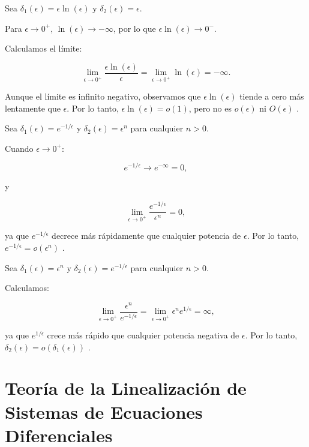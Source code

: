 \begin{example}
    Sea \(\delta_1(\epsilon) = \epsilon \ln(\epsilon)\) y \(\delta_2(\epsilon) = \epsilon\).

Para \(\epsilon \to 0^+\), \(\ln(\epsilon) \to -\infty\), por lo que \(\epsilon \ln(\epsilon) \to 0^-\).

Calculamos el límite:

\[
\lim_{\epsilon \to 0^+} \frac{\epsilon \ln(\epsilon)}{\epsilon} = \lim_{\epsilon \to 0^+} \ln(\epsilon) = -\infty.
\]

Aunque el límite es infinito negativo, observamos que \(\epsilon \ln(\epsilon)\) tiende a cero más lentamente que \(\epsilon\). Por lo tanto, \(\epsilon \ln(\epsilon) = o(1)\), pero no es \(o\left( \epsilon \right)\) ni \(O\left( \epsilon \right)\) \cite{bender2013advanced}.

\end{example}

\begin{example}
    Sea \(\delta_1(\epsilon) = e^{-1/\epsilon}\) y \(\delta_2(\epsilon) = \epsilon^n\) para cualquier \(n > 0\).

Cuando \(\epsilon \to 0^+\):

\[
e^{-1/\epsilon} \to e^{-\infty} = 0,
\]

y

\[
\lim_{\epsilon \to 0^+} \frac{e^{-1/\epsilon}}{\epsilon^n} = 0,
\]

ya que \(e^{-1/\epsilon}\) decrece más rápidamente que cualquier potencia de \(\epsilon\). Por lo tanto, \(e^{-1/\epsilon} = o\left( \epsilon^n \right)\) \cite{bender2013advanced}.

\end{example}

\begin{example}
    Sea \(\delta_1(\epsilon) = \epsilon^n\) y \(\delta_2(\epsilon) = e^{-1/\epsilon}\) para cualquier \(n > 0\).

Calculamos:

\[
\lim_{\epsilon \to 0^+} \frac{\epsilon^n}{e^{-1/\epsilon}} = \lim_{\epsilon \to 0^+} \epsilon^n e^{1/\epsilon} = \infty,
\]

ya que \(e^{1/\epsilon}\) crece más rápido que cualquier potencia negativa de \(\epsilon\). Por lo tanto, \(\delta_2(\epsilon) = o\left( \delta_1(\epsilon) \right)\) \cite{bender2013advanced}.

\end{example}

\section{Teoría de la Linealización de Sistemas de Ecuaciones Diferenciales}

